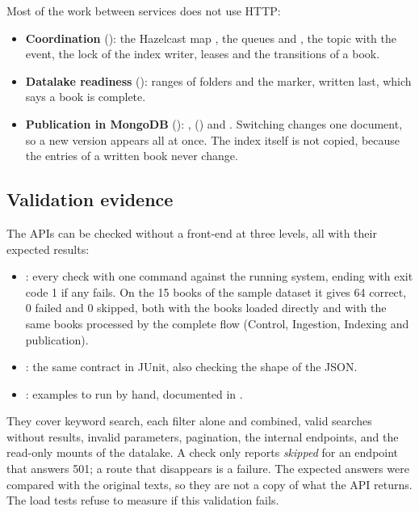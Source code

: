 Most of the work between services does not use HTTP:

\begin{itemize}
  \item \textbf{Coordination} (): the Hazelcast map ,
        the queues  and , the topic  with the
         event, the lock of the index writer, leases and the transitions of a book.
  \item \textbf{Datalake readiness} (): ranges of folders and the
         marker, written last, which says a book is complete.
  \item \textbf{Publication in MongoDB} (): ,  () and
        . Switching  changes one document, so a new version appears
        all at once. The index itself is not copied, because the entries of a written book never change.
\end{itemize}

\subsection{Validation evidence}

The APIs can be checked without a front-end at three levels, all with their expected results:

\begin{itemize}
  \item {}: every check with one command against the running system, ending
        with exit code 1 if any fails. On the 15 books of the sample dataset it gives 64 correct, 0 failed and
        0 skipped, both with the books loaded directly and with the same books processed by the complete
        flow (Control, Ingestion, Indexing and publication).
  \item {}: the same contract in JUnit, also checking the shape of the JSON.
  \item {}: examples to run by hand, documented in .
\end{itemize}

They cover keyword search, each filter alone and combined, valid searches without results, invalid parameters,
pagination, the internal endpoints, and the read-only mounts of the datalake. A check only reports
\textit{skipped} for an endpoint that answers 501; a route that disappears is a failure. The expected answers
were compared with the original texts, so they are not a copy of what the API returns. The load tests refuse
to measure if this validation fails.
